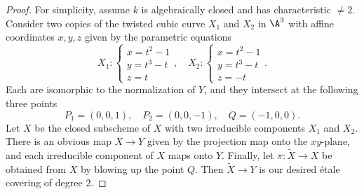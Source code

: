 \documentclass[a4paper]{article}
\begin{document}
\begin{enumerate} [label=\textbf{\arabic*.}, leftmargin=0em]
        \begin{proof}
          For simplicity, assume $k$ is algebraically closed and has characteristic $\neq 2$.
          Consider two copies of the twisted cubic curve $X_1$ and $X_2$ in $\A^3$ with affine coordinates $x, y, z$ given by the parametric equations
          \begin{equation*}
            X_1 : \begin{cases}
              x = t^2 - 1 \\
              y = t^3 - t \\
              z = t
            \end{cases}, \quad X_2 : \begin{cases*}
              x = t^2 - 1 \\
              y = t^3 - t \\
              z = -t
            \end{cases*}.
          \end{equation*}
          Each are isomorphic to the normalization of $Y$, and they intersect at the following three points
          \begin{equation*}
            P_1 = (0, 0, 1), \quad P_2 = (0, 0, -1), \quad Q = (-1, 0, 0).
          \end{equation*}
          Let $X$ be the closed subscheme of $X$ with two irreducible components $X_1$ and $X_2$.
          There is an obvious map $X \to Y$ given by the projection map onto the $xy$-plane, and each irreducible component of $X$ maps onto $Y$.
          Finally, let $\pi : \tilde{X} \to X$ be obtained from $X$ by blowing up the point $Q$.
          Then $\tilde{X} \to Y$ is our desired étale covering of degree 2.
        \end{proof}

\end{enumerate}
\end{document}

